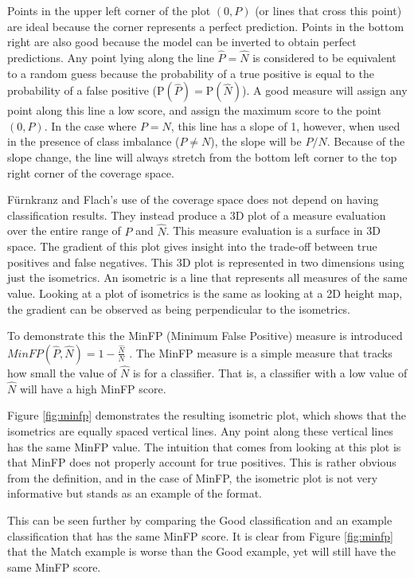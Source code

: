 Points in the upper left corner of the plot $(0, P)$ (or lines that cross this point) are ideal because the corner represents a perfect prediction. Points in the bottom right are also good because the model can be inverted to obtain perfect predictions. Any point lying along the line $\hat P = \hat N$ is considered to be equivalent to a random guess because the probability of a true positive is equal to the probability of a false positive ($\text{P}(\hat P) = \text{P}(\hat N)$). A good measure will assign any point along this line a low score, and assign the maximum score to the point $(0, P)$. In the case where $P = N$, this line has a slope of 1, however, when used in the presence of class imbalance ($P \neq N$), the slope will be $P/N$. Because of the slope change, the line will always stretch from the bottom left corner to the top right corner of the coverage space. 

F{\"u}rnkranz and Flach's use of the coverage space does not depend on having classification results. They instead produce a 3D plot of a measure evaluation over the entire range of $\hat P$ and $\hat N$. This measure evaluation is a surface in 3D space. The gradient of this plot gives insight into the trade-off between true positives and false negatives. This 3D plot is represented in two dimensions using just the isometrics. An isometric is a line that represents all measures of the same value. Looking at a plot of isometrics is the same as looking at a 2D height map, the gradient can be observed as being perpendicular to the isometrics.
 
To demonstrate this the MinFP (Minimum False Positive) measure is introduced
$MinFP(\hat P, \hat N) = 1-\frac{\hat N}{N}$
. The MinFP measure is a simple measure that tracks how small the value of $\hat N$ is for a classifier. That is, a classifier with a low value of $\hat N$ will have a high MinFP score.

Figure \ref{fig:minfp} demonstrates the resulting isometric plot, which shows that the isometrics are equally spaced vertical lines. Any point along these vertical lines has the same MinFP value. The intuition that comes from looking at this plot is that MinFP does not properly account for true positives. This is rather obvious from the definition, and in the case of MinFP, the isometric plot is not very informative but stands as an example of the format.

This can be seen further by comparing the Good classification and an example classification that has the same MinFP score. It is clear from Figure \ref{fig:minfp} that the Match example is worse than the Good example, yet will still have the same MinFP score.


